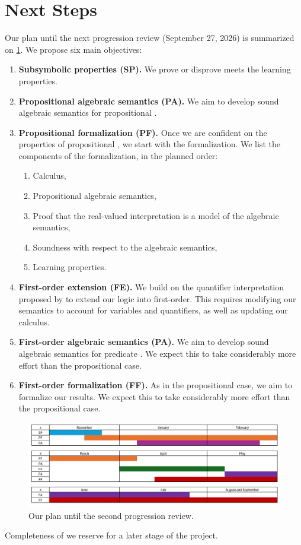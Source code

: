 \section{Next Steps} \label{section:Next Steps}

Our plan until the next progression review (September 27, 2026) is summarized on \cref{2Plan}. We propose six main objectives: 
\begin{enumerate}
    \item \textbf{Subsymbolic properties (SP).} We prove or disprove \OL{} meets the learning properties.
    \item \textbf{Propositional algebraic semantics (PA).} We aim to develop sound algebraic semantics for propositional \OL{}.
    \item \textbf{Propositional formalization (PF).} Once we are confident on the properties of propositional \OL{}, we start with the formalization. We list the components of the formalization, in the planned order:
    \begin{enumerate}
        \item Calculus,
        \item Propositional algebraic semantics,
        \item Proof that the real-valued interpretation is a model of the algebraic semantics,
        \item Soundness with respect to the algebraic semantics,
        \item Learning properties.
        
    \end{enumerate}
    
    \item \textbf{First-order extension (FE).} We build on the quantifier interpretation proposed by \citeauthor{capucci2024quantifiers} to extend our logic into first-order. This requires modifying our semantics to account for variables and quantifiers, as well as updating our calculus.

    \item \textbf{First-order algebraic semantics (PA).} We aim to develop sound algebraic semantics for predicate \OL{}. We expect this to take considerably more effort than the propositional case. 
    
    \item \textbf{First-order formalization (FF).} As in the propositional case, we aim to formalize our results.  We expect this to take considerably more effort than the propositional case.
\end{enumerate}

\begin{figure}[H]
\label{2Plan}
  \includegraphics[width=\linewidth]{Figures/2Plan.png}
  \caption{Our plan until the second progression review.}
\end{figure}

Completeness of \OL{} we reserve for a later stage of the project.